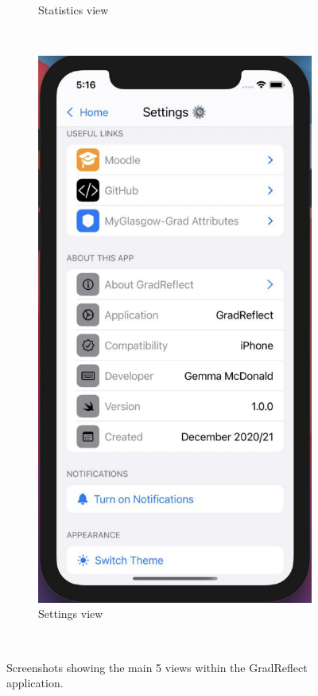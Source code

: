 \documentclass{l4proj}
\begin{document}
\begin{figure}
\begin{subfigure}[b]{0.3\textwidth}
        \caption{Statistics view}
        \label{fig:appStatScreen}
    \end{subfigure}
    ~ %
    \begin{subfigure}[b]{0.3\textwidth}
        \includegraphics[scale=0.25]{images/appSettingsScreen.pdf}
        \caption{Settings view}
        \label{fig:appSettingsScreen}
    \end{subfigure}
    ~ %
    \caption{Screenshots showing the main 5 views within the GradReflect application.}
    \label{fig:appMainViews}
\end{figure}
\end{document}
